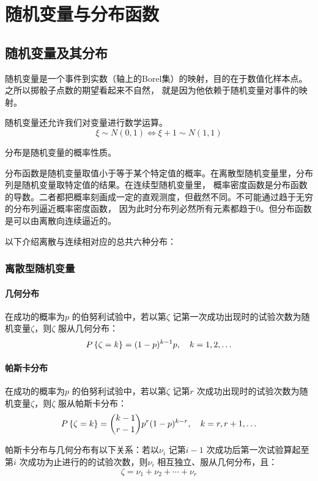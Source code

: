 \chapter{随机变量与分布函数}
\section{随机变量及其分布}
随机变量是一个事件到实数（轴上的Borel集）的映射，目的在于数值化样本点。之所以掷骰子点数的期望看起来不自然，
就是因为他依赖于随机变量对事件的映射。

随机变量还允许我们对变量进行数学运算。\[
    \xi \sim N(0,1) \iff \xi+1 \sim N(1,1)
\]

分布是随机变量的概率性质。

分布函数是随机变量取值小于等于某个特定值的概率。在离散型随机变量里，分布列是随机变量取特定值的结果。在连续型随机变量里，
概率密度函数是分布函数的导数。二者都把概率刻画成一定的直观测度，但截然不同。不可能通过趋于无穷的分布列逼近概率密度函数，
因为此时分布列必然所有元素都趋于0。但分布函数是可以由离散向连续逼近的。

以下介绍离散与连续相对应的总共六种分布：

\subsection{离散型随机变量}
\subsubsection{几何分布} 在成功的概率为\(p\) 的伯努利试验中，若以第\(\zeta\)
记第一次成功出现时的试验次数为随机变量\(\zeta\)，则\(\zeta\) 服从几何分布：
\[
    \P{\zeta=k} = (1-p)^{k-1} p, \quad k=1,2,\ldots
\]

\subsubsection{帕斯卡分布} 在成功的概率为\(p\) 的伯努利试验中，若以第\(\zeta\) 记第\(r\)
次成功出现时的试验次数为随机变量\(\zeta\)，则\(\zeta\) 服从帕斯卡分布：
\[
    \P{\zeta=k} = \binom{k-1}{r-1} p^r
    (1-p)^{k-r}, \quad k=r,r+1,\ldots
\]


帕斯卡分布与几何分布有以下关系：若以\(\nu_{i}\) 记第\(i-1\) 次成功后第一次试验算起至第\(i\)
次成功为止进行的的试验次数，则\(\nu_{i}\) 相互独立、服从几何分布，且：
\[
    \zeta = \nu_{1} + \nu_{2} + \cdots + \nu_{r}
\]

